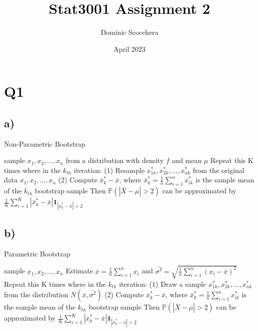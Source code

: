 \documentclass{article}
\title{Stat3001 Assignment 2}
\author{Dominic Scocchera}
\date{April 2023}
\begin{document}
\maketitle
\section*{Q1}
\subsection*{a)}
\begin{algorithm}
\caption{Non-Parametric Bootstrap}\label{alg:cap}
\begin{algorithmic}
\Require sample $x_1,x_2,...,x_n$ from a distribution with density $f$ and mean $\mu$
\State Repeat this K times where in the $k_{th}$ iteration:
\State (1) Resample $x_{1k}^{*},x_{2k}^{*},...,x_{nk}^{*}$ from the original data  $x_1,x_2,...,x_n$
\State (2) Compute $\bar{x}_{k}^{*}-\bar{x}$, where $\bar{x}_{k}^{*}=\frac{1}{n}\sum_{i=1}^{n}x_{ik}^{*}$ is the sample mean of the $k_{th}$ bootstrap sample
\State Then $\mathbb{P}(|\bar{X}-\mu|>2)$ can be approximated by $\frac{1}{K}\sum_{i=1}^{K}|\bar{x}^{*}_{k}-\bar{x}|\mathbf{1} _{|\bar{x}^{*}_{k}-\bar{x}|>2}$
\end{algorithmic}
\end{algorithm}
\subsection*{b)}
\begin{algorithm}
\caption{Parametric Bootstrap}\label{alg:cap}
\begin{algorithmic}
\Require sample $x_1,x_2,...,x_n$
\State Estimate $\bar{x}=\frac{1}{n}\sum_{i=1}^{n}x_i$ and $\bar{\sigma^2}=\sqrt{\frac{1}{n}\sum_{i=1}^{n}(x_i-\bar{x})^2}$
\State Repeat this K times where in the $k_{th}$ iteration:
\State (1) Draw a sample $x_{1k}^{*},x_{2k}^{*},...,x_{nk}^{*}$ from the distribution $N(\bar{x},\bar{\sigma^2})$
\State (2) Compute $\bar{x}_{k}^{*}-\bar{x}$, where $\bar{x}_{k}^{*}=\frac{1}{n}\sum_{i=1}^{n}x_{ik}^{*}$ is the sample mean of the $k_{th}$ bootstrap sample
\State Then $\mathbb{P}(|\bar{X}-\mu|>2)$ can be approximated by $\frac{1}{K}\sum_{i=1}^{K}|\bar{x}^{*}_{k}-\bar{x}|\mathbf{1} _{|\bar{x}^{*}_{k}-\bar{x}|>2}$
\end{algorithmic}
\end{algorithm}
\end{document}
